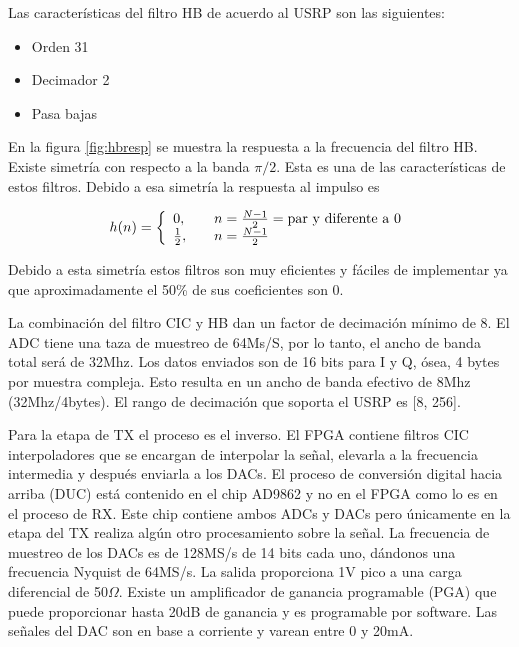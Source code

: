 Las caracter\'isticas del filtro HB de acuerdo al USRP son las siguientes:

\begin{itemize}
  \item Orden 31
  \item Decimador 2
  \item Pasa bajas
\end{itemize}

En la figura \ref{fig:hbresp} se muestra la respuesta a la frecuencia del filtro HB.
Existe simetr\'ia con respecto a la banda $\pi /2$. Esta es una de las
caracter\'isticas de estos filtros. Debido a esa simetr\'ia la respuesta al
impulso es

\begin{equation}
h(n)=\left\{
\begin{array}{l l}
0, & \quad n=\frac{N-1}{2}=\text{par y diferente a 0}\\
\frac{1}{2}, & \quad n=\frac{N-1}{2}
\end{array}\right.
\end{equation}

Debido a esta simetr\'ia estos filtros son muy eficientes y f\'aciles de
implementar ya que aproximadamente el 50\% de sus coeficientes son 0.

La combinaci\'on del filtro CIC y HB dan un factor de decimaci\'on m\'inimo de
8. El ADC tiene una taza de muestreo de 64Ms/S, por lo tanto, el ancho de banda
total ser\'a de 32Mhz. Los datos enviados son de 16 bits para I y Q, \'osea, 4
bytes por muestra compleja. Esto resulta en un ancho de banda efectivo de 8Mhz
(32Mhz/4bytes). El rango de decimaci\'on que soporta el USRP es [8, 256].

Para la etapa de TX el proceso es el inverso. El FPGA contiene filtros CIC interpoladores que se
encargan de interpolar la se\~nal, elevarla a la frecuencia intermedia y despu\'es
enviarla a los DACs. El proceso de conversi\'on digital hacia arriba (DUC)
est\'a contenido en el chip AD9862 y no en el FPGA como lo es en el proceso de
RX. Este chip contiene ambos ADCs y DACs pero \'unicamente en la etapa del TX
realiza alg\'un otro procesamiento sobre la se\~nal. La frecuencia de muestreo
de los DACs es de 128MS/s de 14 bits cada uno, d\'andonos una frecuencia Nyquist
de 64MS/s. La salida proporciona 1V pico a una carga diferencial de 50$\Omega$.
Existe un amplificador de ganancia programable (PGA) que puede proporcionar
hasta 20dB de ganancia y es programable por software. Las se\~nales del DAC son
en base a corriente y varean entre 0 y 20mA.

